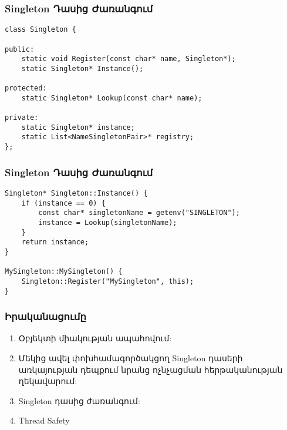 \documentclass{beamer}
\begin{document}
\begin{frame}[fragile]\frametitle{Singleton Դասից Ժառանգում}
\begin{english}
\begin{verbatim}
class Singleton {

public:
    static void Register(const char* name, Singleton*);
    static Singleton* Instance();

protected:
    static Singleton* Lookup(const char* name);

private:
    static Singleton* instance;
    static List<NameSingletonPair>* registry;
};
\end{verbatim}
\end{english}
\end{frame}

\begin{frame}[fragile]\frametitle{Singleton Դասից Ժառանգում}
\begin{english}
\begin{verbatim}
Singleton* Singleton::Instance() {
    if (instance == 0) {
        const char* singletonName = getenv("SINGLETON");
        instance = Lookup(singletonName);
    }
    return instance;
}

MySingleton::MySingleton() {
    Singleton::Register("MySingleton", this);
}
\end{verbatim}
\end{english}
\end{frame}

\begin{frame}\frametitle{Իրականացումը}
\begin{enumerate}
    \item Օբյեկտի միակության ապահովում: \vfill
    \item Մեկից ավել փոխհամագործակցող Singleton դասերի առկայության
    դեպքում նրանց ոչնչացման հերթականության ղեկավարում: \vfill
    \item Singleton դասից ժառանգում: \vfill
    \item Thread Safety
\end{enumerate}
\end{frame}
\end{document}
